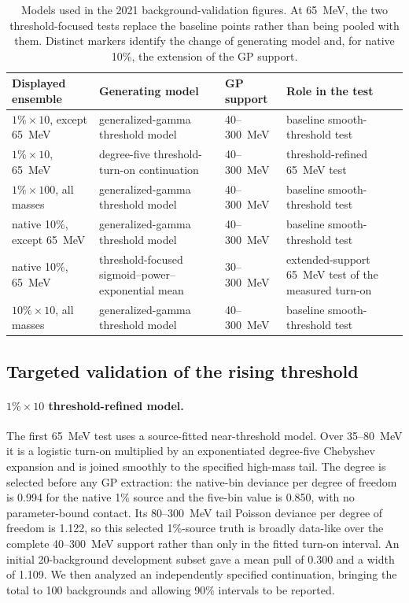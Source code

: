 \begin{table}[htbp]
\centering
\small
\begin{tabularx}{\textwidth}{P{0.17\textwidth}P{0.20\textwidth}P{0.24\textwidth}Y}
\toprule
Displayed ensemble & Generating model & GP support & Role in the test \\
\midrule
$1\%\times10$, except 65~MeV & generalized-gamma threshold model & 40--300~MeV & baseline smooth-threshold test \\
$1\%\times10$, 65~MeV & degree-five threshold-turn-on continuation & 40--300~MeV & threshold-refined 65~MeV test \\
$1\%\times100$, all masses & generalized-gamma threshold model & 40--300~MeV & baseline smooth-threshold test \\
native 10\%, except 65~MeV & generalized-gamma threshold model & 40--300~MeV & baseline smooth-threshold test \\
native 10\%, 65~MeV & threshold-focused sigmoid--power--exponential mean & 30--300~MeV & extended-support 65~MeV test of the measured turn-on \\
$10\%\times10$, all masses & generalized-gamma threshold model & 40--300~MeV & baseline smooth-threshold test \\
\bottomrule
\end{tabularx}
\caption{Models used in the 2021 background-validation figures. At 65~MeV, the two
threshold-focused tests replace the baseline points rather than being pooled with
them. Distinct markers identify the change of generating model and, for native 10\%,
the extension of the GP support.}
\label{tab:v491-composite-scheme-map}
\end{table}

\subsection{Targeted validation of the rising threshold}
\label{sec:v491-threshold-validation}

\paragraph{$1\%\times10$ threshold-refined model.}
The first 65~MeV test uses a source-fitted near-threshold model. Over 35--80~MeV it is a logistic turn-on multiplied by an exponentiated
degree-five Chebyshev expansion and is joined smoothly to the specified high-mass tail.
The degree is selected before any GP extraction: the native-bin deviance per degree of
freedom is 0.994 for the native 1\% source and the five-bin value is 0.850, with no
parameter-bound contact. Its 80--300~MeV tail Poisson deviance per degree
of freedom is 1.122, so this selected 1\%-source truth is broadly data-like over the
complete 40--300~MeV support rather than only in the fitted turn-on interval. An
initial 20-background development subset gave a mean pull of 0.300 and a width of
1.109. We then analyzed an independently specified continuation, bringing the total to
100 backgrounds and allowing 90\% intervals to be reported.

